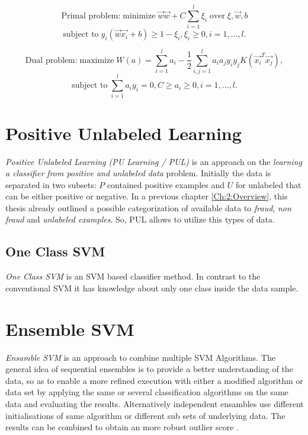 \[\textrm{Primal problem:}\; \textrm{minimize}\; \vec{w} \vec{w} + C \sum_{i=1}^{l} \xi_i\; \textrm{over}\; \xi,\vec{w},b\] 
\[\textrm{subject to}\; y_i(\vec{w}\vec{x_i} + b) \geq 1 - \xi_i,\xi_i \geq 0, i = 1, ...,l.\] 

\[\textrm{Dual problem:}\; \textrm{maximize}\; W(a) =  \sum_{i=1}^{l} a_i - \frac{1}{2}\sum_{i,j = 1}^{l}a_i a_j y_i y_j K(\vec{x_i}^T \vec{x_j}) , \]
\[\textrm{subject to}\; \sum_{i=1}^{l}a_i y_i = 0,C \geq a_i \geq 0, i = 1,...,l.\] 


\section{Positive Unlabeled Learning}\label{Chapter:PUL}
\textit{Positive Unlabeled Learning (PU Learning / PUL)} is an approach on the \textit{learning a classifier from positive and unlabeled data} problem. Initially the data is separated in two subsets: \(P\) contained positive examples and \(U\) for unlabeled that can be either positive or negative. 
In a previous chapter \ref{Ch:2:Overview}, this thesis already outlined a possible categorization of available data to \textit{fraud}, \textit{non fraud} and \textit{unlabeled examples}. So, PUL allows to utilize this types of data.

\subsection{One Class SVM}\label{Chapter:OC-SVM}
\textit{One Class SVM} is an SVM based classifier method. In contrast to the conventional SVM it has knowledge about only one class inside the data sample. 

\section{Ensemble SVM}\label{Chapter:Ensemble}
\textit{Ensamble SVM} is an approach to combine multiple SVM Algorithms. The general idea of sequential ensembles is to provide a better understanding of the data, so as to enable a more refined execution with either a modified algorithm or data set \cite{Aggarwal:2013} by applying the same or several classification algorithms on the same data and evaluating the results. Alternatively independent ensambles use different initialisations of same algorithm or different sub sets of underlying data. The results can be combined to obtain an more robust outlier score \cite{Aggarwal:2013}.






